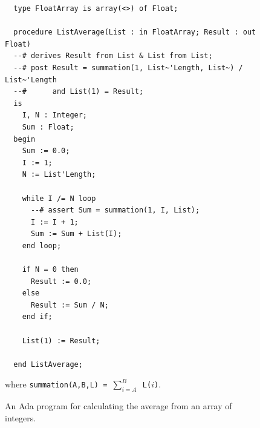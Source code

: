 \begin{figure}[!h]
\begin{verbatim}
  type FloatArray is array(<>) of Float;

  procedure ListAverage(List : in FloatArray; Result : out Float)
  --# derives Result from List & List from List;
  --# post Result = summation(1, List~'Length, List~) / List~'Length
  --#      and List(1) = Result;
  is
    I, N : Integer;
    Sum : Float;
  begin
    Sum := 0.0;
    I := 1;
    N := List'Length;

    while I /= N loop
      --# assert Sum = summation(1, I, List);
      I := I + 1;
      Sum := Sum + List(I);
    end loop;

    if N = 0 then
      Result := 0.0;
    else
      Result := Sum / N;
    end if;

    List(1) := Result;

  end ListAverage;
\end{verbatim}

where {\tt summation(A,B,L) = $\sum_{i=A}^{B}$ \tt L($i$)}.

\caption{An Ada program for calculating the average from an array of integers.}
\label{fig:listave}
\end{figure}


